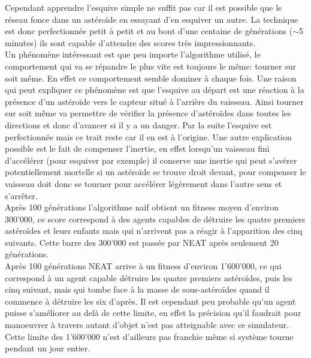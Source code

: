 \documentclass{article}
\begin{document}
Cependant apprendre l'esquive simple ne suffit pas car il est possible que le réseau fonce dans un astéroïde en essayant d'en esquiver un autre. La technique est donc perfectionnée petit à petit et au bout d'une centaine de générations ($\sim$5 minutes) ils sont capable d'attendre des scores très impressionnants.\\

Un phénomène intéressant est que peu importe l'algorithme utilisé, le comportement qui va se répandre le plus vite est toujours le même: tourner sur soit même. En effet ce comportement semble dominer à chaque fois. Une raison qui peut expliquer ce phénomène est que l'esquive au départ est une réaction à la présence d'un astéroïde vers le capteur situé à l'arrière du vaisseau. Ainsi tourner sur soit même va permettre de vérifier la présence d'astéroïdes dans toutes les directions et donc d'avancer si il y a un danger. Par la suite l'esquive est perfectionnée mais ce trait reste car il en est à l'origine. Une autre explication possible est le fait de compenser l'inertie, en effet lorsqu'un vaisseau fini d'accélérer (pour esquiver par exemple) il conserve une inertie qui peut s'avérer potentiellement mortelle si un astéroïde se trouve droit devant, pour compenser le vaisseau doit donc se tourner pour accélérer légèrement dans l'autre sens et s'arrêter.\\

Après 100 générations l'algorithme naïf obtient un fitness moyen d'environ 300'000, ce score correspond à des agents capables de détruire les quatre premiers astéroïdes et leurs enfants mais qui n'arrivent pas a réagir à l'apparition des cinq suivants. Cette barre des 300'000 est passée par NEAT après seulement 20 générations.\\

Après 100 générations NEAT arrive à un fitness d'environ 1'600'000, ce qui correspond à un agent capable détruire les quatre premiers astéroïdes, puis les cinq suivant, mais qui tombe face à la masse de sous-astéroïdes quand il commence à détruire les six d'après. Il est cependant peu probable qu'un agent puisse s'améliorer au delà de cette limite, en effet la précision qu'il faudrait pour manoeuvrer à travers autant d'objet n'est pas atteignable avec ce simulateur. Cette limite des 1'600'000 n'est d'ailleurs pas franchie même si système tourne pendant un jour entier.\\
\end{document}
